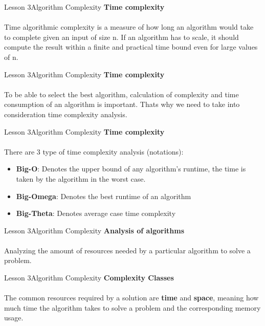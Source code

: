 \documentclass[aspectratio=1610]{beamer}
\begin{document}
\begin{frame}{Lesson 3}{Algorithm Complexity}
\LARGE
\textbf{Time complexity}\\~\\
Time algorithmic complexity is a measure of how long an algorithm would take to 
complete given an input of size n. If an algorithm has to scale, it should 
compute the result within a finite and practical time bound even for 
large values of n.
\end{frame}


\begin{frame}{Lesson 3}{Algorithm Complexity}
\LARGE
\textbf{Time complexity}\\~\\
To be able to select the best algorithm, calculation of complexity and time 
consumption of an algorithm is important. Thats why we need to take into
consideration time complexity analysis.
\end{frame}



\begin{frame}{Lesson 3}{Algorithm Complexity}
\LARGE
\textbf{Time complexity}\\~\\
There are 3 type of time complexity analysis (notations):
\Large
\begin{itemize}
	\item \textbf{Big-O}: Denotes the upper bound of any algorithm’s runtime, the time is taken by the algorithm in the worst case.
	\item \textbf{Big-Omega}: Denotes the best runtime of an algorithm
	\item \textbf{Big-Theta}: Denotes average case time complexity
\end{itemize}

\end{frame}


 
\begin{frame}{Lesson 3}{Algorithm Complexity}
\LARGE
\textbf{Analysis of algorithms}\\~\\
\Large
Analyzing the amount of resources needed by a particular algorithm to solve a 
problem.
\end{frame}


\begin{frame}{Lesson 3}{Algorithm Complexity}
\LARGE
\textbf{Complexity Classes}\\~\\
\Large
The common resources required by a solution are \textbf{time} and
\textbf{space}, meaning how much time the algorithm takes to solve 
a problem and the corresponding memory usage.
\end{frame}
\end{document}
